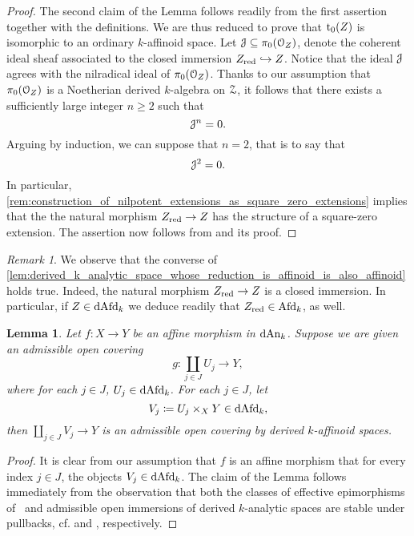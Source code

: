 \documentclass[10pt,a4paper,reqno]{amsart} %
\theoremstyle{plain}
\newtheorem{lem}[thm]{Lemma}
\theoremstyle{definition}
\theoremstyle{remark}
\newtheorem{rem}[thm]{Remark}
\numberwithin{equation}{section}
\begin{document}
\begin{proof} The second claim of the Lemma follows readily from the first assertion together with the definitions.
    We are thus reduced to prove that $\mathrm{t}_0(Z)$ is isomorphic to an ordinary $k$-affinoid space.
    Let $\mathcal J \subseteq \pi_0(\mathcal O_Z)$, denote the coherent ideal sheaf associated to the closed immersion $Z_{\mathrm{red}} \hookrightarrow Z$. Notice that the ideal $\mathcal J$
    agrees with the nilradical ideal of $\pi_0(\mathcal O_Z)$. Thanks to our assumption that $\pi_0(\mathcal O_Z)$ is a Noetherian derived $k$-algebra on $\mathcal Z$, it follows that there exists
    a sufficiently large integer $n \ge 2$ such that
        \[
            \mathcal J^n = 0.  
        \]
    Arguing by induction, we can suppose that $n = 2$, that is to say that
        \[\mathcal J^2 = 0.\]
    In particular, \cref{rem:construction_of_nilpotent_extensions_as_square_zero_extensions} implies that the
    the natural morphism $Z_{\mathrm{red}} \to Z$ has the structure of a square-zero extension.
    The assertion now follows from \cite[Proposition 6.1]{Porta_Yu_Representability}
    and its proof.
\end{proof}

\begin{rem}
    We observe that the converse of \cref{lem:derived_k_analytic_space_whose_reduction_is_affinoid_is_also_affinoid} holds true.
    Indeed, the natural morphism $Z_{\mathrm{red}} \to Z$ is a closed immersion. In particular, if $Z \in \mathrm{dAfd}_k$ we deduce readily
    that $Z_{\mathrm{red}} \in \mathrm{Afd}_k$, as well.
\end{rem}


\begin{lem} \label{lem:affine_morphisms_are_compatible_with_Zariski_localization_on_the_base}
    Let $f \colon X \to Y$ be an affine morphism in $\mathrm{dAn}_k$. Suppose we are given an admissible open covering
        \[
            g \colon \coprod_{j \in J} U_j \to Y,  
        \]
    where for each $j \in J$, $U_j \in \mathrm{dAfd}_k$. For each $j \in J$, let 
        \[
            V_j \coloneqq U_j \times_X Y \in \mathrm{dAfd}_k,  
        \]
    then $\coprod_{j \in J} V_j \to Y$ is an admissible open covering by derived $k$-affinoid spaces.
\end{lem}

\begin{proof} It is clear from our assumption that $f$ is an affine morphism that for every index $j \in J$, the objects $V_j \in \mathrm{dAfd}_k$. The claim of the Lemma
    follows immediately from the observation that
    both the classes of effective epimorphisms of \inftopoi \ and admissible open immersions of derived $k$-analytic spaces are stable under pullbacks,
    cf. \cite[Proposition 6.2.3.15]{HTT} and \cite[Corollary 5.11, Proposition 5.12]{Porta_Yu_Representability}, respectively.
\end{proof}
\end{document}
